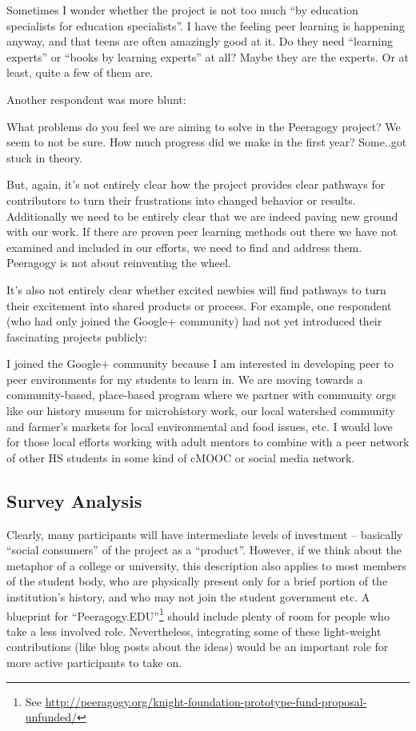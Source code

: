 \documentclass{acm_proc_article-sp}
\begin{document}
Sometimes I wonder whether the project is not too much ``by education specialists for education specialists''. I have the feeling peer learning is happening anyway, and that teens are often amazingly good at it. Do they need ``learning experts'' or ``books by learning experts'' at all? Maybe they are the experts. Or at least, quite a few of them are.

Another respondent was more blunt:

What problems do you feel we are aiming to solve in the Peeragogy project? We seem to not be sure. How much progress did we make in the first year? Some..got stuck in theory.

But, again, it's not entirely clear how the project provides clear pathways for contributors to turn their frustrations into changed behavior or results. Additionally we need to be entirely clear that we are indeed paving new ground with our work. If there are proven peer learning methods out there we have not examined and included in our efforts, we need to find and address them. Peeragogy is not about reinventing the wheel.

It's also not entirely clear whether excited newbies will find pathways to turn their excitement into shared products or process. For example, one respondent (who had only joined the Google+ community) had not yet introduced their fascinating projects publicly:

I joined the Google+ community because I am interested in developing peer to peer environments for my students to learn in. We are moving towards a community-based, place-based program where we partner with community orgs like our history museum for microhistory work, our local watershed community and farmer's markets for local environmental and food issues, etc. I would love for those local efforts working with adult mentors to combine with a peer network of other HS students in some kind of cMOOC or social media network.

\subsection{Survey Analysis}

Clearly, many participants will have intermediate levels of investment -- basically ``social consumers'' of the project as a ``product''. However, if we think about the metaphor of a college or university, this description also applies to most members of the student body, who are physically present only for a brief portion of the institution's history, and who may not join the student government etc. A blueprint for ``Peeragogy.EDU''\footnote{See \url{http://peeragogy.org/knight-foundation-prototype-fund-proposal-unfunded/}} should include plenty of room for people who take a less involved role. Nevertheless, integrating some of these light-weight contributions (like blog posts about the ideas) would be an important role for more active participants to take on.
\end{document}
